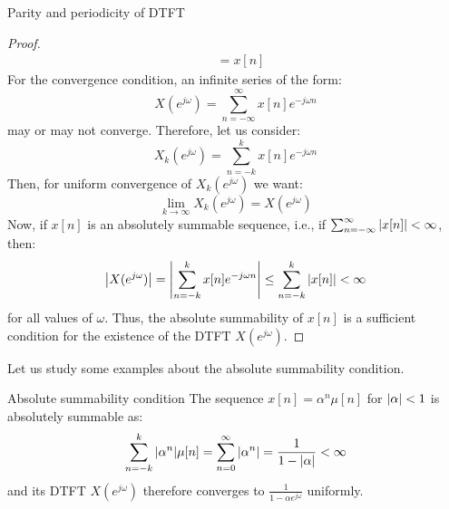 \documentclass[../../main/main.tex]{subfiles}
\begin{document}
\begin{corollary}{Parity and periodicity of DTFT}{}
\begin{proof}
\begin{align}
            &=
                x[n]
        \end{align}
        For the convergence condition, an infinite series of the form:
        \begin{equation}
            X(e^{j\omega})
            =
            \sum_{n=-\infty}^{\infty} x[n] e^{-j\omega n}
            \label{eq:L08_S30_1}
        \end{equation}
        may or may not converge. Therefore, let us consider:
        \begin{equation}
            X_{k}(e^{j\omega})
            =
            \sum_{n=-k}^{k} x[n] e^{-j\omega n}
            \label{eq:L08_S30_2}
        \end{equation}
        Then, for uniform convergence of \( X_{k}(e^{j\omega}) \) we want:
        \begin{equation}
            \lim_{k \to \infty} X_{k}(e^{j\omega})
            =
            X(e^{j\omega})
            \label{eq:L08_S31_1}
        \end{equation}
        Now, if \( x[n] \) is an absolutely summable sequence, i.e., if \( \sum_{n=-\infty}^{\infty} \abs{x[n]} < \infty \), then:
        \begin{equation}
            \abs{X(e^{j\omega})}
            =
            \abs{\sum_{n=-k}^{k} x[n] e^{-j\omega n}}
            \le
            \sum_{n=-k}^{k} \abs{x[n]}
            <
            \infty
            \label{eq:L08_S32_1}
        \end{equation}
        for all values of \( \omega \). Thus, the absolute summability of \( x[n] \) is a sufficient condition for the existence of the DTFT \( X(e^{j\omega}) \).
    \end{proof}
\end{corollary}


\medskip
Let us study some examples about the absolute summability condition.
\begin{example}{Absolute summability condition}{}
    The sequence \( x[n] = \alpha^{n} \mu[n] \) for \( \abs{\alpha} < 1 \) is  absolutely summable as:
    \begin{equation}
        \sum_{n=-k}^{k} \abs{\alpha^{n}} \mu[n]
        =
        \sum_{n=0}^{\infty} \abs{\alpha^{n}}
        =
        \frac{1}{1 - \abs{\alpha}}
        <
        \infty
        \label{eq:L08_S33_1}
    \end{equation}
    and its DTFT \( X(e^{j\omega}) \) therefore converges to \( \frac{1}{1 - \alpha e^{j\omega}} \) uniformly.
\end{example}
\end{document}
